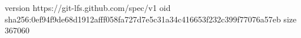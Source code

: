 version https://git-lfs.github.com/spec/v1
oid sha256:0ef94f9de68d1912afff058fa727d7e5c31a34c416653f232c399f77076a57eb
size 367060
